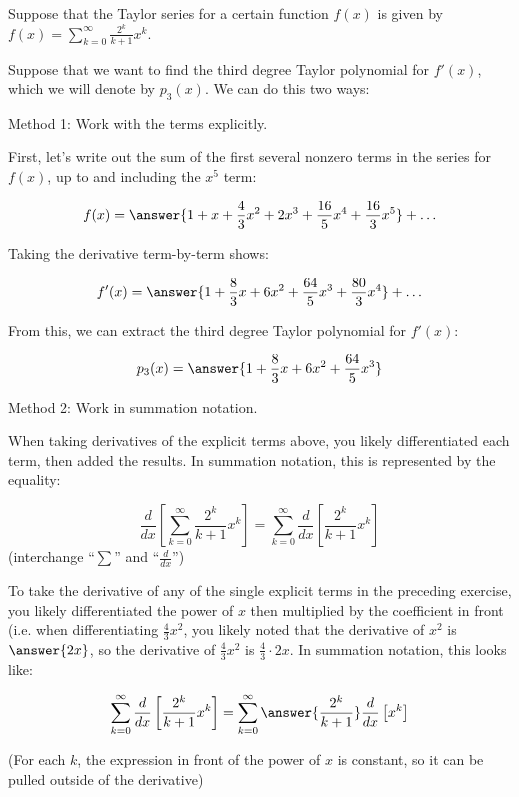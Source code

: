 \documentclass{ximera}
\author{Jim Talamo}
\begin{document}
\begin{exercise}
Suppose that the Taylor series for a certain function $f(x)$ is given by $f(x) = \sum_{k=0}^{\infty} \frac{2^k}{k+1} x^k$.  


Suppose that we want to find the third degree Taylor polynomial for $f'(x)$, which we will denote by $p_3(x)$.  We can do this two ways:

\begin{exercise}
Method 1: Work with the terms explicitly.

First, let's write out the sum of the first several nonzero terms in the series for $f(x)$, up to and including the $x^5$ term:

\[
f(x) = \answer{1+x+\frac{4}{3}x^2+2x^3+\frac{16}{5}x^4+\frac{16}{3}x^5}+\ldots
\]

Taking the derivative term-by-term shows:

\[
f'(x) = \answer{1+\frac{8}{3}x+6x^2+\frac{64}{5}x^3+\frac{80}{3}x^4}+\ldots
\]

From this, we can extract the third degree Taylor polynomial for $f'(x)$:

\[
p_3(x) = \answer{1+\frac{8}{3}x+6x^2+\frac{64}{5}x^3}
\] 

\end{exercise}
\begin{exercise}
Method 2: Work in summation notation.

When taking derivatives of the explicit terms above, you likely differentiated each term, then added the results.  In summation notation, this is represented by the equality:


\[
\frac{d}{dx} \left[\sum_{k=0}^{\infty}  \frac{2^k}{k+1} x^k  \right] = \sum_{k=0}^{\infty}  \frac{d}{dx} \left[\frac{2^k}{k+1} x^k  \right]
\]
(interchange ``$\sum$'' and ``$\frac{d}{dx}$'')

To take the derivative of any of the single explicit terms in the preceding exercise, you likely differentiated the power of $x$ then multiplied by the coefficient in front (i.e. when differentiating $\frac{4}{3}x^2$, you likely noted that the derivative of $x^2$ is $\answer{2x}$, so the derivative of $\frac{4}{3}x^2$ is $\frac{4}{3} \cdot 2x$.  In summation notation, this looks like:

\[
\sum_{k=0}^{\infty}  \frac{d}{dx} \left[\frac{2^k}{k+1} x^k\right] = \sum_{k=0}^{\infty} \answer{\frac{2^k}{k+1}} \frac{d}{dx} \left[ x^k  \right]
\]

(For each $k$, the expression in front of the power of $x$ is constant, so it can be pulled outside of the derivative)


\end{exercise}
\end{exercise}
\end{document}
